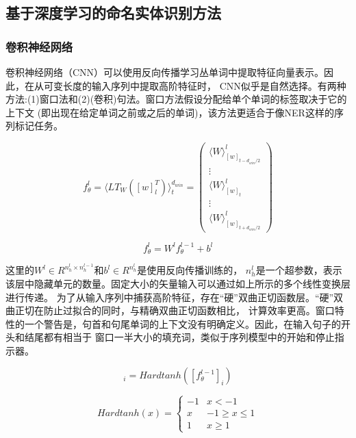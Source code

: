 \subsection{基于深度学习的命名实体识别方法}

\subsubsection{卷积神经网络}

卷积神经网络（CNN）可以使用反向传播学习丛单词中提取特征向量表示。因此，在从可变长度的输入序列中提取高阶特征时，
CNN似乎是自然选择。有两种方法:(1)窗口法和(2)(卷积)句法。窗口方法假设分配给单个单词的标签取决于它的上下文
(即出现在给定单词之前或之后的单词)，该方法更适合于像NER这样的序列标记任务。

\begin{equation}
	f^{l}_{\theta}
	= \langle LT_W( [ w ] ^T_l) \rangle ^{d_{win}}_t
	= \left(
			\begin{array}{c}
			\langle W \rangle ^l_{[w]_{t - d_{win} / 2}} \\
			\vdots \\
			\langle W \rangle ^l_{[w]_t} \\
			\vdots \\
			\langle W \rangle ^l_{[w]_{t + d_{win} / 2}}
		\end{array} 
	\right)
\end{equation}


\begin{equation}
	f^{l}_{\theta} 
	= W^l f^{l - 1}_{\theta} + b^l
\end{equation}

这里的$W^l \in R^{ n^l_h \times n^{l - 1}_h}$和$b^l \in R^{n^l_h}$是使用反向传播训练的，
$n^l_h$是一个超参数，表示该层中隐藏单元的数量。固定大小的矢量输入可以通过如上所示的多个线性变换层进行传递。
为了从输入序列中捕获高阶特征，存在“硬”双曲正切函数层。“硬”双曲正切在防止过拟合的同时，与精确双曲正切函数相比，
计算效率更高。窗口特性的一个警告是，句首和句尾单词的上下文没有明确定义。因此，在输入句子的开头和结尾都有相当于
窗口一半大小的填充词，类似于序列模型中的开始和停止指示器。


\begin{equation}
	[f^{l}_{\theta}]_i 
	= Hard tanh([f^{l - 1}_{\theta}]_i)
\end{equation}


\begin{equation}
	Hard tanh(x)
    = \begin{cases}
        -1 & x < -1 \\
        x & -1 \geq x \leq 1 \\
        1 & x \geq 1
    \end{cases}
\end{equation}


